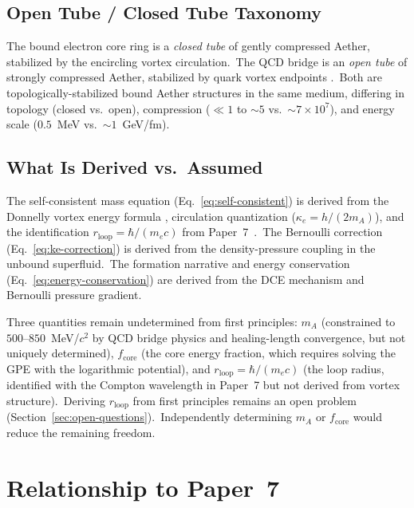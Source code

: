 \documentclass[12pt,letterpaper]{article}
\newcommand{\rloop}{r_{\mathrm{loop}}}
\begin{document}
\subsection{Open Tube / Closed Tube Taxonomy}

The bound electron core ring is a \emph{closed tube} of gently compressed
Aether, stabilized by the encircling vortex circulation.\ The QCD bridge is
an \emph{open tube} of strongly compressed Aether, stabilized by quark
vortex endpoints \cite{otto-strong}.\ Both are topologically-stabilized bound
Aether structures in the same medium, differing in topology (closed vs.\
open), compression ($\ll 1$ to $\sim\!5$ vs.\ $\sim\!7 \times 10^7$), and
energy scale ($0.5$~MeV vs.\ $\sim\!1$~GeV/fm).

\subsection{What Is Derived vs.\ Assumed}

The self-consistent mass equation (Eq.~\ref{eq:self-consistent}) is derived
from the Donnelly vortex energy formula \cite{donnelly1991}, circulation
quantization ($\kappa_e = h/(2m_A)$), and the identification
$\rloop = \hbar/(m_e c)$ from Paper~7~\cite{otto-quantum}.\ The Bernoulli
correction (Eq.~\ref{eq:ke-correction}) is derived from the
density-pressure coupling in the unbound superfluid.\ The formation narrative
and energy conservation (Eq.~\ref{eq:energy-conservation}) are derived from
the DCE mechanism and Bernoulli pressure gradient.

Three quantities remain undetermined from first principles: $m_A$
(constrained to $500$--$850$~MeV/$c^2$ by QCD bridge physics and
healing-length convergence, but not uniquely determined),
$f_{\mathrm{core}}$ (the core energy fraction, which requires solving the
GPE with the logarithmic potential), and $\rloop = \hbar/(m_e c)$ (the loop
radius, identified with the Compton wavelength in Paper~7 but not derived
from vortex structure).\ Deriving $\rloop$ from first principles remains an
open problem (Section~\ref{sec:open-questions}).\ Independently determining
$m_A$ or $f_{\mathrm{core}}$ would reduce the remaining freedom.


\section{Relationship to Paper~7}
\label{sec:relationship}
\end{document}
